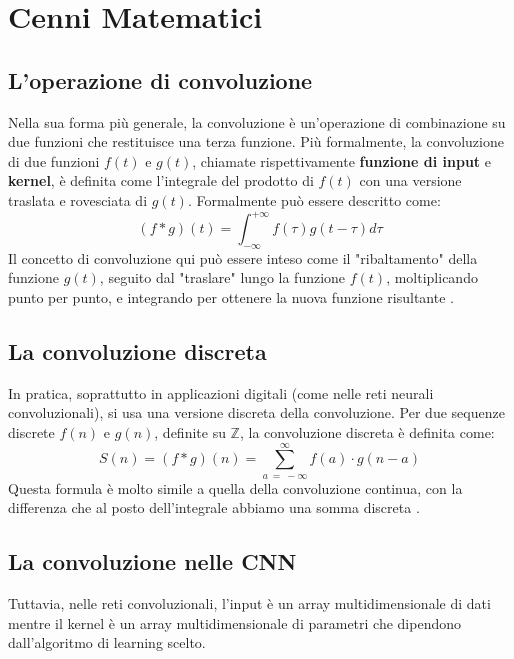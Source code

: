\section{Cenni Matematici}
\subsection{L'operazione di convoluzione}
Nella sua forma più generale, la convoluzione è un'operazione di 
combinazione su due funzioni che restituisce una terza funzione.
Più formalmente, la convoluzione di due funzioni  $f(t)$ e $g(t)$, chiamate rispettivamente 
\textbf{funzione di input} e \textbf{kernel}, è definita come l'integrale del 
prodotto di $f(t)$ con una versione traslata e 
rovesciata di $g(t)$.  Formalmente può essere descritto come:
\begin{equation}
    (f*g)(t)=\int_{-\infty}^{+\infty}f(\tau)g(t-\tau)d\tau
\end{equation}
Il concetto di convoluzione qui può essere inteso come il "ribaltamento" 
della funzione $g(t)$, seguito dal "traslare" lungo la funzione $f(t)$, 
moltiplicando punto per punto, e integrando per ottenere la nuova funzione 
risultante \cite{Definizione_convoluzione_int,ALL_DEEP_LEARNING}.


\subsection{La convoluzione discreta}
In pratica, soprattutto in applicazioni digitali (come nelle reti neurali 
convoluzionali), si usa una versione discreta della convoluzione. 
Per due sequenze discrete $f(n)$ e $g(n)$, definite su $\mathbb{Z}$, 
la convoluzione discreta è definita come:
\begin{equation}
    S(n) = (f * g)(n) = \sum_{a\ =\ - \infty}^{\infty}{f(a)\cdot g(n - a)}
    \label{eq:convoluzioneDiscretaFormula}
\end{equation}
Questa formula è molto simile a quella della convoluzione continua, con la differenza 
che al posto dell'integrale abbiamo una somma discreta \cite{Definizione_convoluzione_int, ALL_DEEP_LEARNING}.

\subsection{La convoluzione nelle CNN}
Tuttavia, nelle reti convoluzionali, l’input è un array multidimensionale di dati mentre il 
kernel è un array multidimensionale di parametri che dipendono dall'algoritmo di learning scelto.

